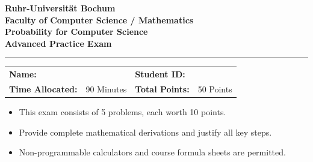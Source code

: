 \documentclass[11pt,a4paper]{article}
\begin{document}
\begin{center}
    {\LARGE \textbf{\color{rubblue}Ruhr-Universit\"at Bochum}}\\[3pt]
    {\large \textbf{Faculty of Computer Science / Mathematics}}\\[4pt]
    {\Large \textbf{Probability for Computer Science}}\\[3pt]
    {\large \textbf{Advanced Practice Exam}}\\[5pt]
    \rule{\textwidth}{1.2pt}
\end{center}

\vspace{0.1cm}
\noindent
\begin{tabularx}{\textwidth}{lX lX}
    \textbf{Name:} & \hrulefill & \textbf{Student ID:} & \hrulefill \\
    \textbf{Time Allocated:} & 90 Minutes & \textbf{Total Points:} & 50 Points \\
\end{tabularx}

\vspace{0.3cm}
\begin{tcolorbox}[colback=lightgrey,colframe=rubblue,title=\textbf{Exam Instructions},arc=1.5mm]
\small
\begin{itemize}[noitemsep,topsep=2pt,leftmargin=5mm]
    \item This exam consists of 5 problems, each worth 10 points.
    \item Provide complete mathematical derivations and justify all key steps.
    \item Non-programmable calculators and course formula sheets are permitted.
\end{itemize}
\end{tcolorbox}

\vspace{0.3cm}

\end{document}
